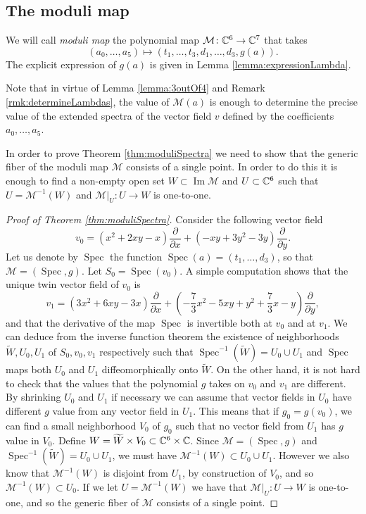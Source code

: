 \documentclass[phd,tocprelim]{cornell}
\begin{document}
\subsection{The moduli map} 

\begin{definition}\label{def:moduliMap}
We will call \textit{moduli map} the polynomial map $\mathcal{M}\colon\mathbb{C}^6\to\mathbb{C}^7$ that takes 
\[ (a_0,\ldots,a_5)\longmapsto (t_1,\ldots,t_3,d_1,\ldots,d_3,g(a)).  \]
The explicit expression of $g(a)$ is given in Lemma \ref{lemma:expressionLambda}.
\end{definition}

Note that in virtue of Lemma \ref{lemma:3outOf4} and Remark \ref{rmk:determineLambdas}, the value of $\mathcal{M}(a)$ is enough to determine the precise value of the extended spectra of the vector field $v$ defined by the coefficients $a_0,\ldots,a_5$.

In order to prove Theorem \ref{thm:moduliSpectra} we need to show that the generic fiber of the moduli map $\mathcal{M}$ consists of a single point. In order to do this it is enough to find a non-empty open set $W\subset\operatorname{Im }\mathcal{M}$ and $U\subset\mathbb{C}^6$ such that $U=\mathcal{M}^{-1}(W)$ and $\mathcal{M}\vert_{U}\colon U\to W$ is one-to-one.

\begin{proof}[Proof of Theorem \ref*{thm:moduliSpectra}]
Consider the following vector field
\[ v_0 = (x^2+2xy-x)\frac{\partial}{\partial x}+(-xy+3y^2-3y)\frac{\partial}{\partial y}. \]
Let us denote by $\operatorname{Spec}$ the function $\operatorname{Spec}(a)=(t_1,\ldots,d_3)$, so that $\mathcal{M}=(\operatorname{Spec},g)$. Let $S_0=\operatorname{Spec}(v_0)$. A simple computation shows that the unique twin vector field of $v_0$ is
\[ v_1 = (3x^2+6xy-3x)\frac{\partial}{\partial x}+\left(-\frac{7}{3}x^2-5xy+y^2+\frac{7}{3}x-y\right)\frac{\partial}{\partial y}, \]
and that the derivative of the map $\operatorname{Spec}$ is invertible both at $v_0$ and at $v_1$. We can deduce from the inverse function theorem the existence of neighborhoods $\widetilde{W}, U_0, U_1$ of $S_0,v_0,v_1$ respectively such that $\operatorname{Spec}^{-1}(\widetilde{W})= U_0\cup U_1$ and $\operatorname{Spec}$ maps both $ U_0$ and $ U_1$ diffeomorphically onto $\widetilde{W}$. On the other hand, it is not hard to check that the values that the polynomial $g$ takes on $v_0$ and $v_1$ are different. By shrinking $ U_0$ and $ U_1$ if necessary we can assume that vector fields in $ U_0$ have different $g$ value from any vector field in $ U_1$. This means that if $g_0=g(v_0)$, we can find a small neighborhood $V_0$ of $g_0$ such that no vector field from $ U_1$ has $g$ value in $V_0$. Define $W=\widetilde{W}\times V_0\subset\mathbb{C}^6\times\mathbb{C}$. Since $\mathcal{M}=(\operatorname{Spec},g)$ and $\operatorname{Spec}^{-1}(\widetilde{W})= U_0\cup U_1$, we must have $\mathcal{M}^{-1}(W)\subset  U_0\cup U_1$. However we also know that $\mathcal{M}^{-1}(W)$ is disjoint from $ U_1$, by construction of $V_0$, and so $\mathcal{M}^{-1}(W)\subset U_0$. If we let $U=\mathcal{M}^{-1}(W)$ we have that $\mathcal{M}\vert_{U}\colon U\to W$ is one-to-one, and so the generic fiber of $\mathcal{M}$ consists of a single point.
\end{proof}
\end{document}
